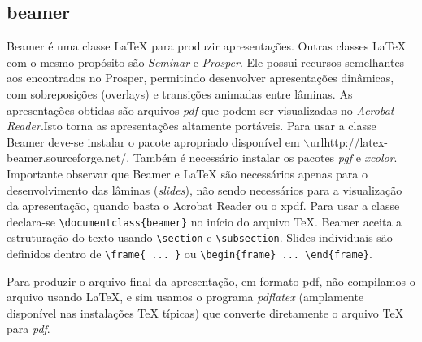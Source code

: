 \documentclass[12pt]{article}
\begin{document}
		\subsection{beamer}
			Beamer é uma classe \LaTeX{} para produzir apresentações. Outras
			classes \LaTeX{} com o mesmo propósito são \emph{Seminar} e
			\emph{Prosper}. Ele possui recursos semelhantes aos encontrados no Prosper, permitindo
			desenvolver apresentações dinâmicas, com sobreposições (overlays)
			e transições animadas entre lâminas. As apresentações obtidas são arquivos \emph{pdf} que podem ser
			visualizadas no \emph{Acrobat Reader}.Isto torna as	apresentações altamente portáveis.
			Para usar a classe Beamer deve-se instalar o pacote apropriado
			disponível em $\backslash$url{http://latex-beamer.sourceforge.net/}. Também é
			necessário instalar os pacotes \emph{pgf} e \emph{xcolor}. Importante
			observar que Beamer e \LaTeX{} são necessários apenas para o
			desenvolvimento das lâminas (\emph{slides}), não sendo necessários para
			a visualização da apresentação, quando basta o Acrobat Reader ou o xpdf.
			Para usar a classe declara-se
			\verb+\documentclass{beamer}+ no início do arquivo \TeX. Beamer aceita
			a estruturação do texto usando \verb+\section+ e
			\verb+\subsection+. Slides individuais são definidos dentro de
			\verb+\frame{ ... }+ ou \verb+\begin{frame} ... \end{frame}+.
			
			Para produzir o arquivo final da apresentação, em formato pdf, não
			compilamos o arquivo
			usando \LaTeX{}, e sim usamos o programa \emph{pdflatex} (amplamente
			disponível nas instalações \TeX{} típicas) que converte diretamente o
			arquivo \TeX{} para \emph{pdf}.
		
\end{document}
